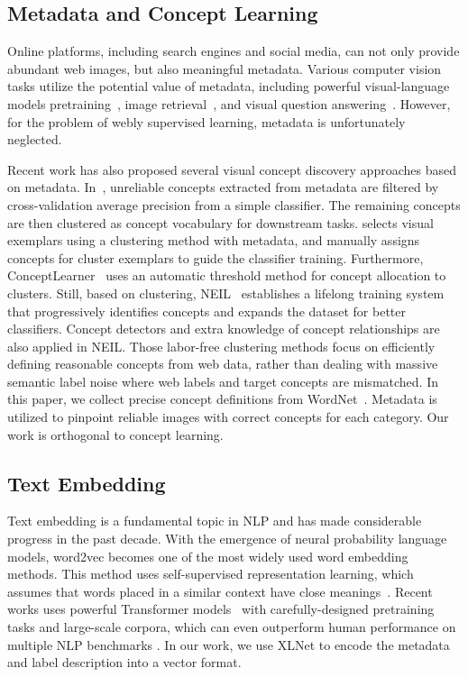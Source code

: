 \documentclass[sigconf]{acmart}
\begin{document}
\subsection{Metadata and Concept Learning}
\label{sec:related-text}
Online platforms, including search engines and social media, can not only provide abundant web images, but also meaningful metadata. Various computer vision tasks utilize the potential value of metadata, including powerful visual-language models pretraining~\cite{lu2019vilbert, su2019vlbert}, image retrieval~\cite{espinoza2013earth,li2015weakly}, and visual question answering~\cite{krishna2017visualgenome,sharma2018conceptual}. 
However, for the problem of webly supervised learning, metadata is unfortunately neglected.
    
Recent work has also proposed several visual concept discovery approaches based on metadata.
In~\cite{sun2015automatic}, unreliable concepts extracted from metadata are filtered by cross-validation average precision from a simple classifier. The remaining concepts are then clustered as concept vocabulary for downstream tasks.
\cite{berg2006animals} selects visual exemplars using a clustering method with metadata, and manually assigns concepts for cluster exemplars to guide the classifier training.
Furthermore, ConceptLearner~\cite{zhou2015conceptlearner} uses an automatic threshold method for concept allocation to clusters.
Still, based on clustering, NEIL~\cite{chen2013neil} establishes a lifelong training system that progressively identifies concepts and expands the dataset for better classifiers. 
Concept detectors and extra knowledge of concept relationships are also applied in NEIL.
Those labor-free clustering methods focus on efficiently defining reasonable concepts from web data, rather than dealing with massive semantic label noise where web labels and target concepts are mismatched. 
In this paper, we collect precise concept definitions from WordNet~\cite{miller1998wordnet}. Metadata is utilized to pinpoint reliable images with correct concepts for each category. Our work is orthogonal to concept learning. 


\subsection{Text Embedding}
Text embedding is a fundamental topic in NLP and has made considerable progress in the past decade. With the emergence of neural probability language models, word2vec becomes one of the most widely used word embedding methods. 
This method uses self-supervised representation learning, which assumes that words placed in a similar context have close meanings~\cite{mikolov2013word2vec}. 
Recent works uses powerful Transformer models~\cite{vaswani2017attention} with carefully-designed pretraining tasks and large-scale corpora, which can even outperform human performance on multiple NLP benchmarks \cite{su2019vlbert,yang2019xlnet,liu2019roberta}. In our work, we use XLNet to encode the metadata and label description into a vector format.
\end{document}
